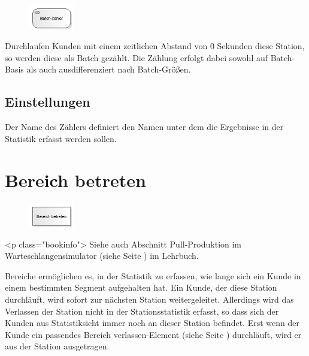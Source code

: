 \begin{figure}
\vspace{-22pt}
\includegraphics[width=2cm]{imageModelElementCounterBatch.png}
\vspace{-22pt}
\end{figure}

Durchlaufen Kunden mit einem zeitlichen Abstand von 0 Sekunden diese Station, so werden diese
als Batch gezählt. Die Zählung erfolgt dabei sowohl auf Batch-Basis als auch ausdifferenziert
nach Batch-Größen.

\subsection*{Einstellungen}

Der Name des Zählers definiert den Namen unter dem die Ergebnisse in der Statistik erfasst werden sollen.


\section{Bereich betreten}
\label{ref:ModelElementSectionStart}

\begin{figure}
\vspace{-22pt}
\includegraphics[width=2cm]{imageModelElementSectionStart.png}
\vspace{-22pt}
\end{figure}

<p class="bookinfo">
Siehe auch Abschnitt Pull-Produktion im Warteschlangensimulator (siehe Seite \pageref{ref:book:7.6.3}) im Lehrbuch.

Bereiche ermöglichen es, in der Statistik zu erfassen, wie lange sich ein Kunde in einem bestimmten
Segment aufgehalten hat. Ein Kunde, der diese Station durchläuft, wird sofort zur nächsten Station
weitergeleitet. Allerdings wird das Verlassen der Station nicht in der Stationsstatistik erfasst,
so dass sich der Kunden aus Statistiksicht immer noch an dieser Station befindet. Erst wenn der
Kunde ein passendes Bereich verlassen-Element (siehe Seite \pageref{ref:ModelElementSectionEnd}) durchläuft,
wird er aus der Station ausgetragen.

